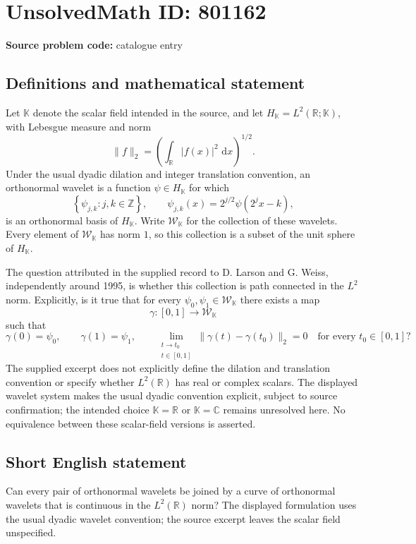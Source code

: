 \documentclass[11pt]{article}
\newcommand{\dd}{\,\mathrm{d}}
\begin{document}
\section*{UnsolvedMath ID: 801162}
\textbf{Source problem code:} catalogue entry
\subsection{Definitions and mathematical statement}
Let \(\mathbb K\) denote the scalar field intended in the source, and let \(H_{\mathbb K}=L^2(\mathbb R;\mathbb K)\), with Lebesgue measure and norm
\[
\|f\|_2=\left(\int_{\mathbb R}|f(x)|^2\,\dd x\right)^{1/2}.
\]
Under the usual dyadic dilation and integer translation convention, an orthonormal wavelet is a function \(\psi\in H_{\mathbb K}\) for which
\[
\left\{\psi_{j,k}:j,k\in\mathbb Z\right\},\qquad
\psi_{j,k}(x)=2^{j/2}\psi(2^j x-k),
\]
is an orthonormal basis of \(H_{\mathbb K}\). Write \(\mathcal W_{\mathbb K}\) for the collection of these wavelets. Every element of \(\mathcal W_{\mathbb K}\) has norm \(1\), so this collection is a subset of the unit sphere of \(H_{\mathbb K}\).

The question attributed in the supplied record to D. Larson and G. Weiss, independently around 1995, is whether this collection is path connected in the \(L^2\) norm. Explicitly, is it true that for every \(\psi_0,\psi_1\in\mathcal W_{\mathbb K}\) there exists a map
\[
\gamma:[0,1]\longrightarrow\mathcal W_{\mathbb K}
\]
such that
\[
\gamma(0)=\psi_0,\qquad \gamma(1)=\psi_1,\qquad
\lim_{\substack{t\to t_0\\t\in[0,1]}}
\|\gamma(t)-\gamma(t_0)\|_2=0
\quad\text{for every }t_0\in[0,1]?
\]
The supplied excerpt does not explicitly define the dilation and translation convention or specify whether \(L^2(\mathbb R)\) has real or complex scalars. The displayed wavelet system makes the usual dyadic convention explicit, subject to source confirmation; the intended choice \(\mathbb K=\mathbb R\) or \(\mathbb K=\mathbb C\) remains unresolved here. No equivalence between these scalar-field versions is asserted.
\subsection{Short English statement}
Can every pair of orthonormal wavelets be joined by a curve of orthonormal wavelets that is continuous in the \(L^2(\mathbb R)\) norm? The displayed formulation uses the usual dyadic wavelet convention; the source excerpt leaves the scalar field unspecified.
\end{document}
